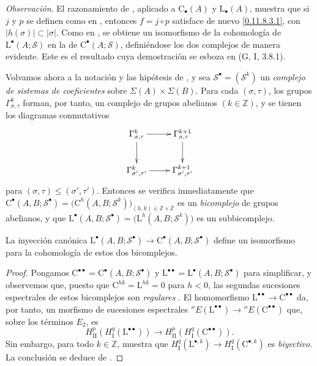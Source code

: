 \begin{env}[11.8.7]
\label{0.11.8.7}
\label{0.11.8.7-fr}
\emph{Observación}.
El razonamiento de , aplicado a
$\mathrm C_\bullet(A)$ y $\mathrm L_\bullet(A)$, muestra que si
$j$ y $p$ se definen como en , entonces
$f=j\circ p$ satisface de nuevo \eqref{0.11.8.3.1}, con
$|h(\sigma)|\subset|\sigma|$.
Como en , se obtiene un isomorfismo de la cohomología de
$\mathrm L^\bullet(A;\mathscr S)$ en la de
$\mathrm C^\bullet(A;\mathscr S)$, definiéndose los dos complejos de manera
evidente.
Este es el resultado cuya demostración se esboza en (G, I, 3.8.1).
\end{env}

\begin{env}[11.8.8]
\label{0.11.8.8}
\label{0.11.8.8-fr}
Volvamos ahora a la notación y las hipótesis de , y sea
$\mathscr S^\bullet=(\mathscr S^k)$
un \emph{complejo} \emph{de sistemas de coeficientes} sobre
$\Sigma(A)\times\Sigma(B)$.
Para cada $(\sigma,\tau)$, los grupos $\Gamma^k_{\sigma,\tau}$
forman, por tanto, un complejo de grupos abelianos $(k\in\mathbb Z)$, y se tienen los diagramas conmutativos
\[
\xymatrix{
\Gamma^k_{\sigma,\tau}\ar[r]\ar[d] &
\Gamma^{k+1}_{\sigma,\tau}\ar[d]\\
\Gamma^k_{\sigma',\tau'}\ar[r] &
\Gamma^{k+1}_{\sigma',\tau'}
}
\]
para $(\sigma,\tau)\leq(\sigma',\tau')$. Entonces se verifica inmediatamente que
$\mathrm C^\bullet(A,B;\mathscr S^\bullet)
=\bigl(\mathrm C^h(A,B;\mathscr S^k)\bigr)_{(h,k)\in\mathbb Z\times\mathbb Z}$
es un \emph{bicomplejo} de grupos abelianos, y que
$\mathrm L^\bullet(A,B;\mathscr S^\bullet)
=\bigl(\mathrm L^h(A,B;\mathscr S^k)\bigr)$
es un subbicomplejo.
\end{env}

\begin{proposition}[11.8.9]
\label{0.11.8.9}
\label{0.11.8.9-fr}
La inyección canónica
$\mathrm L^\bullet(A,B;\mathscr S^\bullet)\to
\mathrm C^\bullet(A,B;\mathscr S^\bullet)$ define un isomorfismo para la cohomología de estos dos bicomplejos.
\end{proposition}

\begin{proof}
Pongamos $\mathrm C^{\bullet\bullet}=
\mathrm C^\bullet(A,B;\mathscr S^\bullet)$ y $\mathrm L^{\bullet\bullet}=
\mathrm L^\bullet(A,B;\mathscr S^\bullet)$ para simplificar, y observemos que, puesto que $\mathrm C^{hk}=\mathrm L^{hk}=0$ para $h<0$, las segundas
sucesiones espectrales de estos bicomplejos son \emph{regulares}
.
El homomorfismo
$\mathrm L^{\bullet\bullet}\to\mathrm C^{\bullet\bullet}$ da, por tanto,
un morfismo de sucesiones espectrales
${}''E(\mathrm L^{\bullet\bullet})\to
{}''E(\mathrm C^{\bullet\bullet})$
que, sobre los términos $E_2$, es
\[
\label{0.11.8.9.1-fr}
\tag{11.8.9.1}
H^p_{\mathrm{II}}(H^q_{\mathrm I}(\mathrm L^{\bullet\bullet}))
\longrightarrow
H^p_{\mathrm{II}}(H^q_{\mathrm I}(\mathrm C^{\bullet\bullet})).
\]
Sin embargo, para todo $k\in\mathbb Z$,  muestra que
$H^q_{\mathrm I}(\mathrm L^{\bullet,k})\to
H^q_{\mathrm I}(\mathrm C^{\bullet,k})$
es \emph{biyectivo}.
La conclusión se deduce de .
\end{proof}


